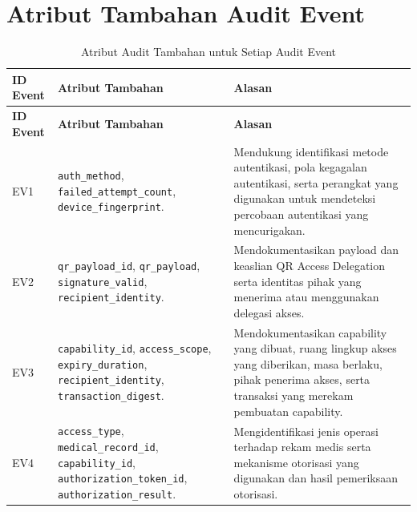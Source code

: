 \chapter{Atribut Tambahan Audit Event}

\begin{xltabular}
{\textwidth}
{|>{\centering\arraybackslash}p{1.2cm}
 |>{\raggedright\arraybackslash}p{5.8cm}
 |X|}

\caption{Atribut Audit Tambahan untuk Setiap Audit Event}
\label{tab:detail-audit-record}\\

\hline

\textbf{ID Event} &
\textbf{Atribut Tambahan} &
\textbf{Alasan} \\

\hline
\endfirsthead

\hline

\textbf{ID Event} &
\textbf{Atribut Tambahan} &
\textbf{Alasan} \\

\hline
\endhead

\hline
\endfoot

\hline
\endlastfoot

EV1 &
\texttt{auth\_method}, \texttt{failed\_attempt\_count}, \texttt{device\_fingerprint}. &
Mendukung identifikasi metode autentikasi, pola kegagalan autentikasi, serta perangkat yang digunakan untuk mendeteksi percobaan autentikasi yang mencurigakan. \\

\hline

EV2 &
\texttt{qr\_payload\_id}, \texttt{qr\_payload}, \texttt{signature\_valid}, \texttt{recipient\_identity}. &
Mendokumentasikan payload dan keaslian QR Access Delegation serta identitas pihak yang menerima atau menggunakan delegasi akses. \\

\hline

EV3 &
\texttt{capability\_id}, \texttt{access\_scope}, \texttt{expiry\_duration}, \texttt{recipient\_identity}, \texttt{transaction\_digest}. &
Mendokumentasikan capability yang dibuat, ruang lingkup akses yang diberikan, masa berlaku, pihak penerima akses, serta transaksi yang merekam pembuatan capability. \\

\hline

EV4 &
\texttt{access\_type}, \texttt{medical\_record\_id}, \texttt{capability\_id}, \texttt{authorization\_token\_id}, \texttt{authorization\_result}. &
Mengidentifikasi jenis operasi terhadap rekam medis serta mekanisme otorisasi yang digunakan dan hasil pemeriksaan otorisasi. \\


\end{xltabular}
